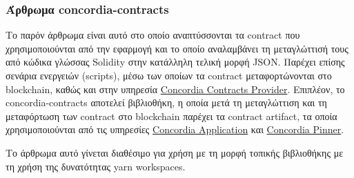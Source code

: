 \subsubsection{Άρθρωμα concordia-contracts} \label{subsubsection:4-3-1-concordia-contracts-unit}

Το παρόν άρθρωμα είναι αυτό στο οποίο αναπτύσσονται τα contract που χρησιμοποιούνται από την εφαρμογή και το οποίο αναλαμβάνει τη μεταγλώττισή τους από κώδικα γλώσσας Solidity στην κατάλληλη τελική μορφή JSON. Παρέχει επίσης σενάρια ενεργειών (scripts), μέσω των οποίων τα contract μεταφορτώνονται στο blockchain, καθώς και στην υπηρεσία \hyperref[subsection:4-3-5-concordia-contracts-provider-service]{Concordia Contracts Provider}. Επιπλέον, το concordia-contracts αποτελεί βιβλιοθήκη, η οποία μετά τη μεταγλώττιση και τη μεταφόρτωση των contract στο blockchain παρέχει τα contract artifact, τα οποία χρησιμοποιούνται από τις υπηρεσίες \hyperref[subsection:4-3-2-concordia-application-service]{Concordia Application} και \hyperref[subsection:4-3-4-concordia-pinner-service]{Concordia Pinner}.

Το άρθρωμα αυτό γίνεται διαθέσιμο για χρήση με τη μορφή τοπικής βιβλιοθήκης με τη χρήση της δυνατότητας yarn workspaces.